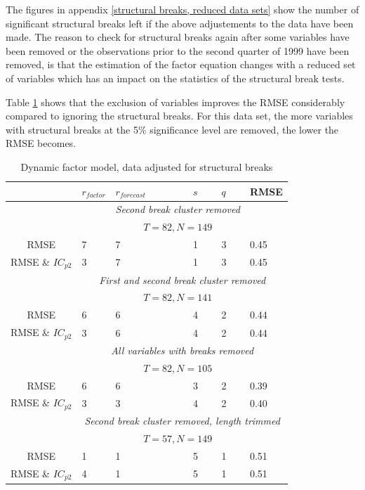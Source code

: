 \documentclass[12pt]{article}
\begin{document}
The figures in appendix \ref{structural breaks, reduced data sets} show the number of significant structural breaks left if the above adjustements to the data have been made. The reason to check for structural breaks again after some variables have been removed or the observations prior to the second quarter of 1999 have been removed, is that the estimation of the factor equation changes with a reduced set of variables which has an impact on the statistics of the structural break tests.

Table \ref{results dynamic factor model, reduced data sets} shows that the exclusion of variables improves the RMSE considerably compared to ignoring the structural breaks. For this data set, the more variables with structural breaks at the 5\% significance level are removed, the lower the RMSE becomes.

\begin{table}[ht]
	\centering
	\begin{tabular}{c|lllll}
		   & $r_{factor}$ & $r_{forecast}$ & $s$ & $q$ & RMSE \\
		 \hline
		 \hline
		    & & \multicolumn{3}{c}{\textit{Second break cluster removed}} \\
			& & \multicolumn{3}{c}{$T=82, N=149$} \\
		  \hline
		   	RMSE & 7 & 7 & 1 & 3 & 0.45 \\
		   	RMSE \& $IC_{p2}$ & 3 & 7 & 1 & 3 & 0.45 \\
		  \hline
		  \hline
		  & \multicolumn{5}{c}{\textit{First and second break cluster removed}} \\ 
			& & \multicolumn{3}{c}{$T=82, N=141$} \\
		  \hline
		   	RMSE & 6 & 6 & 4 & 2 & 0.44 \\
		   	RMSE \& $IC_{p2}$ & 3 & 6 & 4 & 2 & 0.44 \\
		  \hline
		  \hline
	  	  & \multicolumn{5}{c}{\textit{All variables with breaks removed}} \\ 
			& & \multicolumn{3}{c}{$T=82, N=105$} \\
          \hline
		   	RMSE & 6 & 6 & 3 & 2 & 0.39 \\
		   	RMSE \& $IC_{p2}$ & 3 & 3 & 4 & 2 & 0.40 \\
		  \hline
		  \hline
		  & \multicolumn{5}{c}{\textit{Second break cluster removed, length trimmed}} \\
			& & \multicolumn{3}{c}{$T=57, N=149$} \\
		  \hline
		   	RMSE & 1 & 1 & 5 & 1 & 0.51 \\
		   	RMSE \& $IC_{p2}$ & 4 & 1 & 5 & 1 & 0.51 \\
		  \hline
		  \hline		  
	\end{tabular}
	\caption{Dynamic factor model, data adjusted for structural breaks}
	\label{results dynamic factor model, reduced data sets}
\end{table}
\end{document}
